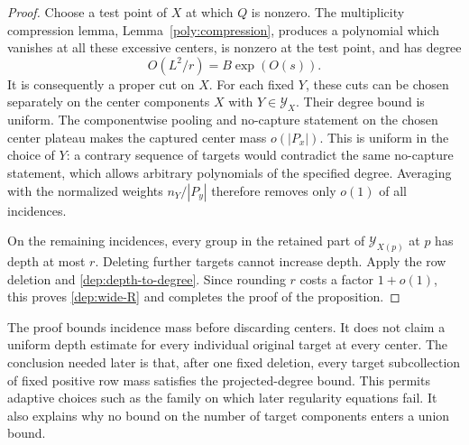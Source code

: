 \begin{proof}
Choose a test point of $X$ at which $Q$ is nonzero. The multiplicity
compression lemma, Lemma~\ref{poly:compression}, produces a polynomial
which vanishes at all these excessive centers, is nonzero at the
test point, and has degree
\[
 O(L^2/r)=B\exp(O(s)).
\]
It is consequently a proper cut on $X$.
For each fixed $Y$, these cuts can be chosen separately on the center
components $X$ with $Y\in\mathcal Y_X$. Their degree bound is uniform.
The componentwise pooling and no-capture statement on the chosen
center plateau makes the captured center mass $o(|P_x|)$.
This is uniform in the choice of $Y$: a contrary sequence of targets
would contradict the same no-capture statement, which allows arbitrary
polynomials of the specified degree. Averaging with the normalized
weights $n_Y/|P_y|$ therefore removes only $o(1)$ of all incidences.

On the remaining incidences, every group in the retained part of
$\mathcal Y_{X(p)}$ at $p$ has depth at most $r$.
Deleting further targets cannot increase depth.
Apply the row deletion and \eqref{dep:depth-to-degree}. Since rounding
$r$ costs a factor $1+o(1)$, this proves \eqref{dep:wide-R} and
completes the proof of the proposition.
\end{proof}

\begin{remark}\label{dep:uniformity-remark}
The proof bounds incidence mass before discarding centers. It does
not claim a uniform depth estimate for every individual original
target at every center. The conclusion needed later is that, after
one fixed deletion, every target subcollection
of fixed positive row mass satisfies the projected-degree bound.
This permits adaptive choices such as the family on which later
regularity equations fail. It also explains why no bound on the
number of target components enters a union bound.
\end{remark}
